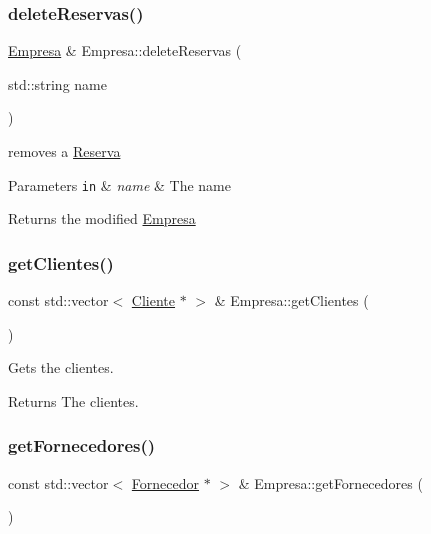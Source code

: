 \subsubsection{\texorpdfstring{delete\+Reservas()}{deleteReservas()}}
{\footnotesize\ttfamily \hyperlink{classEmpresa}{Empresa} \& Empresa\+::delete\+Reservas (\begin{DoxyParamCaption}\item[{std\+::string}]{name }\end{DoxyParamCaption})}



removes a \hyperlink{classReserva}{Reserva} 


\begin{DoxyParams}[1]{Parameters}
\mbox{\tt in}  & {\em name} & The name\\
\hline
\end{DoxyParams}
\begin{DoxyReturn}{Returns}
the modified \hyperlink{classEmpresa}{Empresa} 
\end{DoxyReturn}
\mbox{\label{classEmpresa_a472beae89ee1187e1ec3f70e9d4a99ef}} 
\subsubsection{\texorpdfstring{get\+Clientes()}{getClientes()}}
{\footnotesize\ttfamily const std\+::vector$<$ \hyperlink{classCliente}{Cliente} $\ast$ $>$ \& Empresa\+::get\+Clientes (\begin{DoxyParamCaption}{ }\end{DoxyParamCaption})}



Gets the clientes. 

\begin{DoxyReturn}{Returns}
The clientes. 
\end{DoxyReturn}
\mbox{\label{classEmpresa_aaf131a375aa70819205744328a4dbc07}} 
\subsubsection{\texorpdfstring{get\+Fornecedores()}{getFornecedores()}}
{\footnotesize\ttfamily const std\+::vector$<$ \hyperlink{classFornecedor}{Fornecedor} $\ast$ $>$ \& Empresa\+::get\+Fornecedores (\begin{DoxyParamCaption}{ }\end{DoxyParamCaption})}



